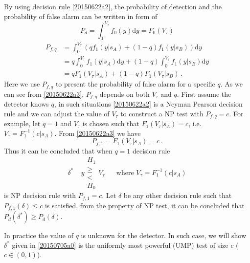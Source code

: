 By using decision rule \eqref{20150622a2}, the probability of detection and the probability of false alarm can be written in form of 
\begin{equation}
  P_d = \int_{0}^{V_\tau} f_0(y) \mathrm{d}y = F_0(V_\tau)
  \label{20150701a3}
\end{equation}
\begin{equation}
  \begin{split}
  P_{f,q} &= \int_{0}^{V_\tau} (qf_1(y|s_A) + (1-q)f_1(y|s_B))\mathrm{d}y\\
  &= q\int_{0}^{V_\tau} f_1(y|s_A)\mathrm{d}y  + (1-q)\int_0^{V_\tau}f_1(y|s_B)\mathrm{d}y\\
      &= qF_1(V_\tau|s_A) + (1-q)F_1(V_\tau|s_B)\,.
    \end{split}
    \label{20150622a3}
  \end{equation}
  Here we use $P_{f,q}$ to present the probability of false alarm for a specific $q$.
  As we can see from \eqref{20150622a3},  $P_{f,q}$ depends on both $V_\tau$ and $q$.  
  First assume the detector knows $q$, in such situations \eqref{20150622a2} is a Neyman Pearson decision rule and  we can adjust the value of $V_\tau$ to construct a NP test with $P_{f,q} = c$.
  For example, let $q = 1$ and $V_\tau$ is chosen such that $F_1(V_\tau|s_A) = c$, i.e. $V_\tau = F_1^{-1}(c|s_A)$. From \eqref{20150622a3} we have 
\begin{equation}
  P_{f,1} = F_1(V_\tau|s_A) = c\,.
  \label{20150623a0}
\end{equation}
Thus it can be concluded that when $q = 1$ decision rule 
\begin{equation}
\delta^\ast \;\;\;\;y \substack{H_1 \\ \geq \\ < \\ H_0} V_\tau\;\;\;\;\;\;\text{where $V_\tau = F_1^{-1}(c|s_A)$}
\label{20150705a0}
\end{equation}
is NP decision rule with  $P_{f, 1} = c$. Let $\delta$ be any other decision rule such that $P_{f, 1}(\delta) \leq c$ is satisfied, from the property of NP test, it can be concluded that $P_d(\delta^\ast) \geq P_d(\delta)$.  

In practice the value of $q$ is unknown for the detector. In such case, we will show $ \delta^\ast$ given in \eqref{20150705a0} is the uniformly most powerful (UMP) test of size $c$ ($c \in (0, 1)$). 
 
